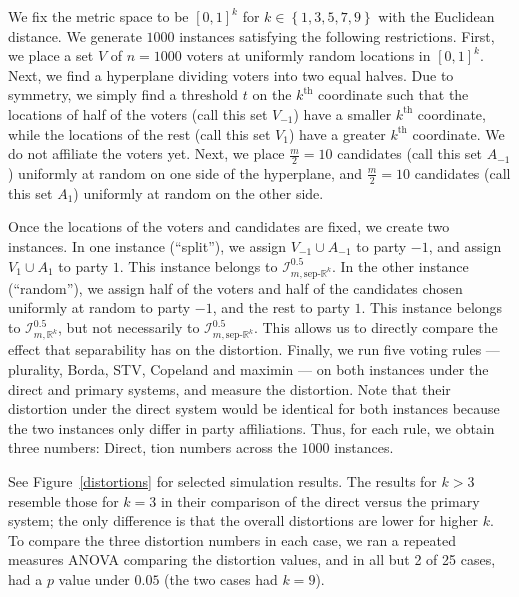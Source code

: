 \documentclass[letterpaper]{article} %
\theoremstyle{definition}
\newcommand{\set}[1]{\left\{#1\right\}}
\newcommand{\bbR}{\mathbb{R}}
\newcommand{\calI}{\mathcal{I}}
\newcommand{\pleft}{-1}
\newcommand{\pright}{1}
\newcommand{\sep}{\textrm{sep-}}
\newcommand{\euc}[1]{\bbR^{#1}}
\newcommand{\eucsep}[1]{\sep\euc{#1}}
\newcommand{\I}{\calI}
\begin{document}
We fix the metric space to be $[0,1]^k$ for $k \in \set{1,3,5,7,9}$ with the Euclidean distance. We generate $1000$ instances satisfying the following restrictions. First, we place a set $V$ of $n = 1000$ voters at uniformly random locations in $[0,1]^k$. Next, we find a hyperplane dividing voters into two equal halves. Due to symmetry, we simply find a threshold $t$ on the $k^{\text{th}}$ coordinate such that the locations of half of the voters (call this set $V_{\pleft}$) have a smaller $k^{\text{th}}$ coordinate, while the locations of the rest (call this set $V_{\pright}$) have a greater $k^{\text{th}}$ coordinate. We do not affiliate the voters yet. Next, we place $\frac{m}{2} = 10$ candidates (call this set $A_{\pleft}$) uniformly at random on one side of the hyperplane,  and $\frac{m}{2} = 10$ candidates (call this set $A_{\pright}$) uniformly at random on the other side.

Once the locations of the voters and candidates are fixed, we create two instances. In one instance (``split''), we assign $V_{\pleft} \cup A_{\pleft}$ to party $\pleft$, and assign $V_{\pright} \cup A_{\pright}$ to party $\pright$. This instance belongs to $\I^{0.5}_{m,\eucsep{k}}$. In the other instance (``random''), we assign half of the voters and half of the candidates chosen uniformly at random to party $\pleft$, and the rest to party $\pright$. This instance belongs to $\I^{0.5}_{m,\euc{k}}$, but not necessarily to $\I^{0.5}_{m,\eucsep{k}}$. This allows us to directly compare the effect that separability has on the distortion. Finally, we run five voting rules --- plurality, Borda, STV, Copeland and maximin --- on both instances under the direct and primary systems, and measure the distortion. Note that their distortion under the direct system would be identical for both instances because the two instances only differ in party affiliations. Thus, for each rule, we obtain three numbers: Direct, tion numbers across the $1000$ instances.

See Figure~\ref{distortions} for selected simulation results. The results for $k > 3$ resemble those for $k=3$ in their comparison of the direct versus the primary system; the only difference is that the overall distortions are lower for higher $k$. To compare the three distortion numbers in each case, we ran a repeated measures ANOVA comparing the distortion values, and in all but 2 of 25 cases, had a $p$ value under $0.05$ (the two cases had $k=9$).
\end{document}

